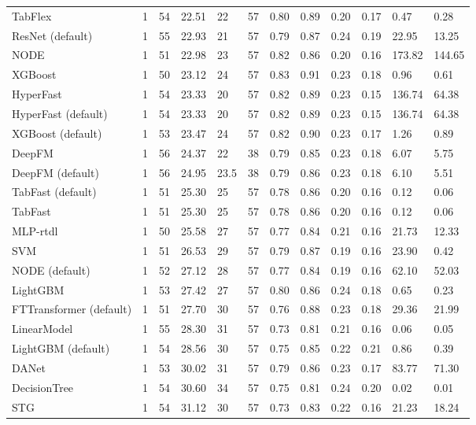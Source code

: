 \begin{tabular}{lllllrllllll}
TabFlex & 1 & 54 & 22.51 & 22 & 57 & 0.80 & 0.89 & 0.20 & 0.17 & 0.47 & 0.28 \\
ResNet (default) & 1 & 55 & 22.93 & 21 & 57 & 0.79 & 0.87 & 0.24 & 0.19 & 22.95 & 13.25 \\
NODE & 1 & 51 & 22.98 & 23 & 57 & 0.82 & 0.86 & 0.20 & 0.16 & 173.82 & 144.65 \\
XGBoost & 1 & 50 & 23.12 & 24 & 57 & 0.83 & 0.91 & 0.23 & 0.18 & 0.96 & 0.61 \\
HyperFast & 1 & 54 & 23.33 & 20 & 57 & 0.82 & 0.89 & 0.23 & 0.15 & 136.74 & 64.38 \\
HyperFast (default) & 1 & 54 & 23.33 & 20 & 57 & 0.82 & 0.89 & 0.23 & 0.15 & 136.74 & 64.38 \\
XGBoost (default) & 1 & 53 & 23.47 & 24 & 57 & 0.82 & 0.90 & 0.23 & 0.17 & 1.26 & 0.89 \\
DeepFM & 1 & 56 & 24.37 & 22 & 38 & 0.79 & 0.85 & 0.23 & 0.18 & 6.07 & 5.75 \\
DeepFM (default) & 1 & 56 & 24.95 & 23.5 & 38 & 0.79 & 0.86 & 0.23 & 0.18 & 6.10 & 5.51 \\
TabFast (default) & 1 & 51 & 25.30 & 25 & 57 & 0.78 & 0.86 & 0.20 & 0.16 & 0.12 & 0.06 \\
TabFast & 1 & 51 & 25.30 & 25 & 57 & 0.78 & 0.86 & 0.20 & 0.16 & 0.12 & 0.06 \\
MLP-rtdl & 1 & 50 & 25.58 & 27 & 57 & 0.77 & 0.84 & 0.21 & 0.16 & 21.73 & 12.33 \\
SVM & 1 & 51 & 26.53 & 29 & 57 & 0.79 & 0.87 & 0.19 & 0.16 & 23.90 & 0.42 \\
NODE (default) & 1 & 52 & 27.12 & 28 & 57 & 0.77 & 0.84 & 0.19 & 0.16 & 62.10 & 52.03 \\
LightGBM & 1 & 53 & 27.42 & 27 & 57 & 0.80 & 0.86 & 0.24 & 0.18 & 0.65 & 0.23 \\
FTTransformer (default) & 1 & 51 & 27.70 & 30 & 57 & 0.76 & 0.88 & 0.23 & 0.18 & 29.36 & 21.99 \\
LinearModel & 1 & 55 & 28.30 & 31 & 57 & 0.73 & 0.81 & 0.21 & 0.16 & 0.06 & 0.05 \\
LightGBM (default) & 1 & 54 & 28.56 & 30 & 57 & 0.75 & 0.85 & 0.22 & 0.21 & 0.86 & 0.39 \\
DANet & 1 & 53 & 30.02 & 31 & 57 & 0.79 & 0.86 & 0.23 & 0.17 & 83.77 & 71.30 \\
DecisionTree & 1 & 54 & 30.60 & 34 & 57 & 0.75 & 0.81 & 0.24 & 0.20 & 0.02 & 0.01 \\
STG & 1 & 54 & 31.12 & 30 & 57 & 0.73 & 0.83 & 0.22 & 0.16 & 21.23 & 18.24 \\

\end{tabular}
